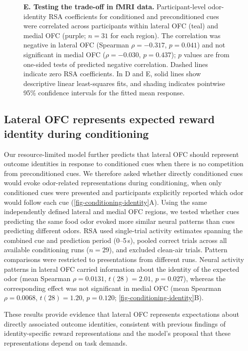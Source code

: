 \documentclass[9pt,twocolumn,twoside]{pnas-new}
\begin{document}
\begin{figure}[!t]
{\textbf{E. Testing the trade-off in fMRI data.} Participant-level odor-identity RSA coefficients for conditioned and preconditioned cues were correlated across participants within lateral OFC (teal) and medial OFC (purple; $n=31$ for each region). The correlation was negative in lateral OFC (Spearman $\rho=-0.317$, $p=0.041$) and not significant in medial OFC ($\rho=-0.030$, $p=0.437$); $p$ values are from one-sided tests of predicted negative correlation. Dashed lines indicate zero RSA coefficients. In D and E, solid lines show descriptive linear least-squares fits, and shading indicates pointwise 95\% confidence intervals for the fitted mean response.
}
\label{fig-identity-simu}
\end{figure}




\subsection*{Lateral OFC represents expected reward identity during conditioning}
\label{subsec-conditioning-identity}

Our resource-limited model further predicts that lateral OFC should represent outcome identities in response to conditioned cues when there is no competition from preconditioned cues. We therefore asked whether directly conditioned cues would evoke odor-related representations during conditioning, when only conditioned cues were presented and participants explicitly reported which odor would follow each cue (\autoref{fig-conditioning-identity}A). Using the same independently defined lateral and medial OFC regions, we tested whether cues predicting the same food odor evoked more similar neural patterns than cues predicting different odors. RSA used single-trial activity estimates spanning the combined cue and prediction period (0--5\,s), pooled correct trials across all available conditioning runs ($n = 29$), and excluded clean-air trials. Pattern comparisons were restricted to presentations from different runs. Neural activity patterns in lateral OFC carried information about the identity of the expected odor (mean Spearman $\rho = 0.0131$, $t(28) = 2.01$, $p = 0.027$), whereas the corresponding effect was not significant in medial OFC (mean Spearman $\rho = 0.0068$, $t(28) = 1.20$, $p = 0.120$; \autoref{fig-conditioning-identity}B).

These results provide evidence that lateral OFC represents expectations about directly associated outcome identities, consistent with previous findings of identity-specific reward representations \cite{howard2015identity,howard2017identity,liuyaoatt24,witkowski2026identity} and the model's proposal that these representations depend on task demands.
\end{document}
